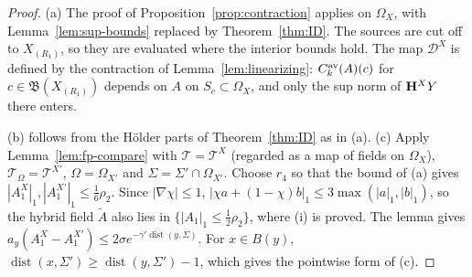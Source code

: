 \begin{proof}
(a) The proof of Proposition~\ref{prop:contraction} applies on $\Omega_X$, with Lemma~\ref{lem:sup-bounds} replaced by Theorem~\ref{thm:ID}. The sources are cut off to $X_{(R_1)}$, so they are evaluated where the interior bounds hold. The map $\mathcal D^X$ is defined by the contraction of Lemma~\ref{lem:linearizing}: $C^{\rm av}_k(A)(c)$ for $c\in\mathfrak B(X_{(R_1)})$ depends on $A$ on $S_c\subset\Omega_X$, and only the sup norm of $\mathbf H^XY$ there enters.

(b) follows from the H\"older parts of Theorem~\ref{thm:ID} as in (a). (c) Apply Lemma~\ref{lem:fp-compare} with $\mathcal T=\mathcal T^X$ (regarded as a map of fields on $\Omega_X$), $\mathcal T_\Omega=\mathcal T^{X'}$, $\Omega=\Omega_{X'}$ and $\Sigma=\Sigma'\cap\Omega_{X'}$. Choose $r_4$ so that the bound of (a) gives $|A^X_1|_1,|A^{X'}_1|_1\le\frac16\rho_2$. Since $|\nabla\chi|\le1$, $|\chi a+(1-\chi)b|_1\le3\max(|a|_1,|b|_1)$, so the hybrid field $\tilde A$ also lies in $\{|A_1|_1\le\frac12\rho_2\}$, where (i) is proved. The lemma gives $a_y(A^X_1-A^{X'}_1)\le2\sigma e^{-\gamma'\operatorname{dist}(y,\Sigma)}$. For $x\in B(y)$, $\operatorname{dist}(x,\Sigma')\ge\operatorname{dist}(y,\Sigma')-1$, which gives the pointwise form of (c).


\end{proof}
